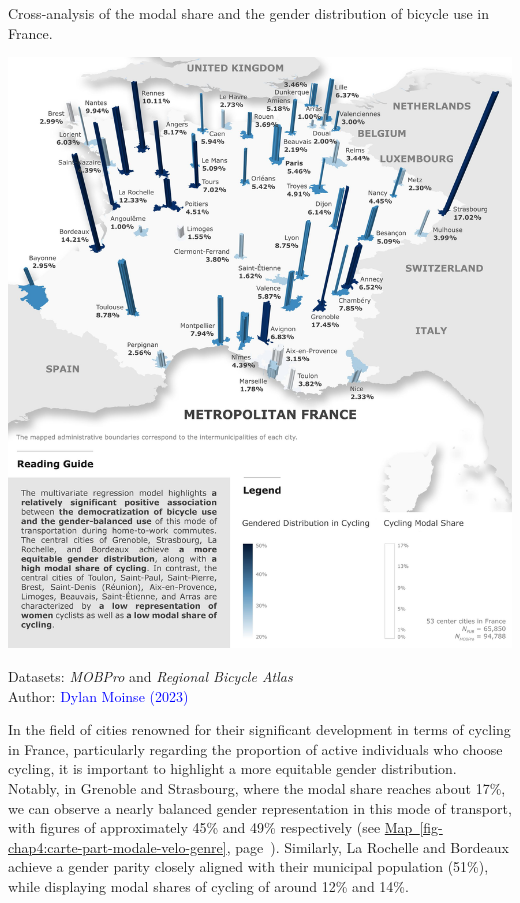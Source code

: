 \begin{refsegment}
\begin{carte}[h!]\vspace*{4pt}
    \caption{Cross-analysis of the modal share and the gender distribution of bicycle use in France.}
    \label{fig-chap4:carte-part-modale-velo-genre}
    \centerline{\includegraphics[width=1\columnwidth]{src/Figures/Chap-4/EN_Democratisation_velo_genre_OLS.jpg}}
    \vspace{5pt}
    \begin{flushright}\scriptsize{
    Datasets: \textsl{MOBPro} \textcolor{blue}{\autocite{insee_documentation_2023}} and \textsl{Regional Bicycle Atlas} \textcolor{blue}{\autocite{velo__territoires_atlas_2023}}
    \\
    Author: \textcolor{blue}{Dylan Moinse (2023)}
    }\end{flushright}
\end{carte}

In the field of cities renowned for their significant development in terms of cycling in France, particularly regarding the proportion of active individuals who choose cycling, it is important to highlight a more equitable gender distribution. Notably, in Grenoble and Strasbourg, where the modal share reaches about 17\%, we can observe a nearly balanced gender representation in this mode of transport, with figures of approximately 45\% and 49\% respectively (see \hyperref[fig-chap4:carte-part-modale-velo-genre]{Map~\ref{fig-chap4:carte-part-modale-velo-genre}}, page~\pageref{fig-chap4:carte-part-modale-velo-genre}). Similarly, La Rochelle and Bordeaux achieve a gender parity closely aligned with their municipal population (51\%), while displaying modal shares of cycling of around 12\% and 14\%. %


\end{refsegment}

